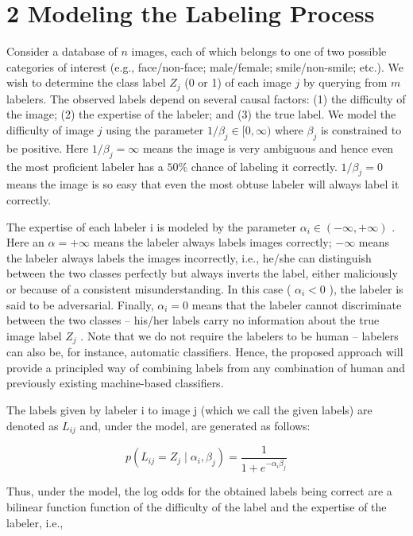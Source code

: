 \documentclass[
]{article}
\begin{document}
\section{2 Modeling the Labeling
Process}\label{modeling-the-labeling-process}

Consider a database of \(n\) images, each of which belongs to one of two
possible categories of interest (e.g., face/non-face; male/female;
smile/non-smile; etc.). We wish to determine the class label \(Z_{j}\)
(0 or 1) of each image \(j\) by querying from \(m\) labelers. The
observed labels depend on several causal factors: (1) the difficulty of
the image; (2) the expertise of the labeler; and (3) the true label. We
model the difficulty of image \(j\) using the parameter
\(1 / \beta_{j} \in [0, \infty)\) where \(\beta_{j}\) is constrained to
be positive. Here \(1 / \beta_{j} = \infty\) means the image is very
ambiguous and hence even the most proficient labeler has a \(50\%\)
chance of labeling it correctly. \(1 / \beta_{j} = 0\) means the image
is so easy that even the most obtuse labeler will always label it
correctly.

The expertise of each labeler i is modeled by the parameter
\(\alpha_{i} \in (-\infty, +\infty)\) . Here an \(\alpha = +\infty\)
means the labeler always labels images correctly; \(-\infty\) means the
labeler always labels the images incorrectly, i.e., he/she can
distinguish between the two classes perfectly but always inverts the
label, either maliciously or because of a consistent misunderstanding.
In this case ( \(\alpha_{i} < 0\) ), the labeler is said to be
adversarial. Finally, \(\alpha_{i} = 0\) means that the labeler cannot
discriminate between the two classes -- his/her labels carry no
information about the true image label \(Z_{j}\) . Note that we do not
require the labelers to be human -- labelers can also be, for instance,
automatic classifiers. Hence, the proposed approach will provide a
principled way of combining labels from any combination of human and
previously existing machine-based classifiers.

The labels given by labeler i to image j (which we call the given
labels) are denoted as \(L_{ij}\) and, under the model, are generated as
follows:

\[
p \left(L _ {i j} = Z _ {j} \mid \alpha_ {i}, \beta_ {j}\right) = \frac {1}{1 + e ^ {- \alpha_ {i} \beta_ {j}}} \tag {1}
\]

Thus, under the model, the log odds for the obtained labels being
correct are a bilinear function function of the difficulty of the label
and the expertise of the labeler, i.e.,
\end{document}
